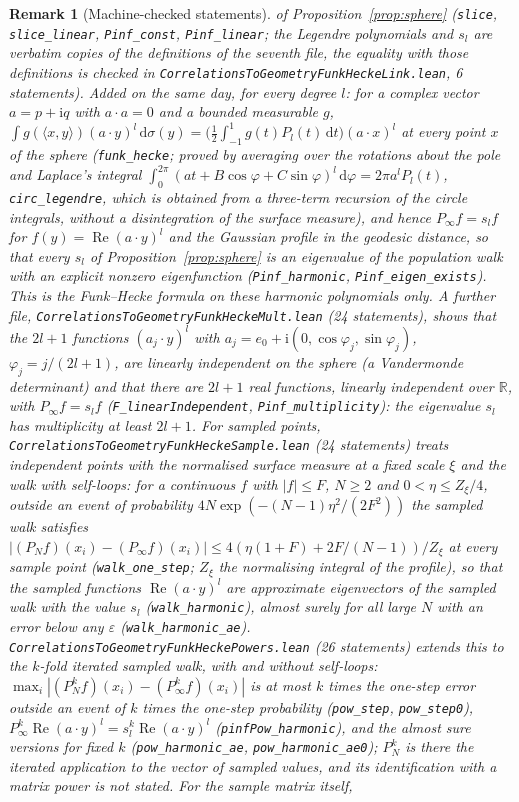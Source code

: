 \documentclass[11pt,a4paper]{article}
\theoremstyle{stmt}
\theoremstyle{defn}
\theoremstyle{rmk}
\newtheorem{remark}[theorem]{Remark}
\numberwithin{equation}{section}
\newcommand{\R}{\mathbb{R}}
\newcommand{\dd}{\mathrm{d}}
\begin{document}
{\begin{remark}[Machine-checked statements]
of Proposition~\ref{prop:sphere} (\texttt{slice}, \texttt{slice\_linear}, \texttt{Pinf\_const}, \texttt{Pinf\_linear}; the Legendre polynomials and $s_l$ are verbatim copies of the definitions of the seventh file, the equality with those definitions is checked in \texttt{CorrelationsToGeometryFunkHeckeLink.lean}, 6 statements). Added on the same day, for every degree $l$: for a complex vector $a=p+\mathrm i q$ with $a\cdot a=0$ and a bounded measurable $g$, $\int g(\langle x,y\rangle)(a\cdot y)^l\,\dd\sigma(y)=\bigl(\tfrac12\int_{-1}^1 g(t)P_l(t)\,\dd t\bigr)(a\cdot x)^l$ at every point $x$ of the sphere (\texttt{funk\_hecke}; proved by averaging over the rotations about the pole and Laplace's integral $\int_0^{2\pi}(at+B\cos\varphi+C\sin\varphi)^l\,\dd\varphi=2\pi a^lP_l(t)$, \texttt{circ\_legendre}, which is obtained from a three-term recursion of the circle integrals, without a disintegration of the surface measure), and hence $P_\infty f=s_l f$ for $f(y)=\operatorname{Re}(a\cdot y)^l$ and the Gaussian profile in the geodesic distance, so that every $s_l$ of Proposition~\ref{prop:sphere} is an eigenvalue of the population walk with an explicit nonzero eigenfunction (\texttt{Pinf\_harmonic}, \texttt{Pinf\_eigen\_exists}). This is the Funk--Hecke formula on these harmonic polynomials only. A further file, \texttt{CorrelationsToGeometryFunkHeckeMult.lean} (24 statements), shows that the $2l+1$ functions $(a_j\cdot y)^l$ with $a_j=e_0+\mathrm i(0,\cos\varphi_j,\sin\varphi_j)$, $\varphi_j=j/(2l+1)$, are linearly independent on the sphere (a Vandermonde determinant) and that there are $2l+1$ real functions, linearly independent over $\R$, with $P_\infty f=s_lf$ (\texttt{F\_linearIndependent}, \texttt{Pinf\_multiplicity}): the eigenvalue $s_l$ has multiplicity at least $2l+1$. For sampled points, \texttt{CorrelationsToGeometryFunkHeckeSample.lean} (24 statements) treats independent points with the normalised surface measure at a fixed scale $\xi$ and the walk with self-loops: for a continuous $f$ with $|f|\le F$, $N\ge2$ and $0<\eta\le Z_\xi/4$, outside an event of probability $4N\exp(-(N-1)\eta^2/(2F^2))$ the sampled walk satisfies $|(P_Nf)(x_i)-(P_\infty f)(x_i)|\le4(\eta(1+F)+2F/(N-1))/Z_\xi$ at every sample point (\texttt{walk\_one\_step}; $Z_\xi$ the normalising integral of the profile), so that the sampled functions $\operatorname{Re}(a\cdot y)^l$ are approximate eigenvectors of the sampled walk with the value $s_l$ (\texttt{walk\_harmonic}), almost surely for all large $N$ with an error below any $\varepsilon$ (\texttt{walk\_harmonic\_ae}). \texttt{CorrelationsToGeometryFunkHeckePowers.lean} (26 statements) extends this to the $k$-fold iterated sampled walk, with and without self-loops: $\max_i|(P_N^kf)(x_i)-(P_\infty^kf)(x_i)|$ is at most $k$ times the one-step error outside an event of $k$ times the one-step probability (\texttt{pow\_step}, \texttt{pow\_step0}), $P_\infty^k\operatorname{Re}(a\cdot y)^l=s_l^k\operatorname{Re}(a\cdot y)^l$ (\texttt{pinfPow\_harmonic}), and the almost sure versions for fixed $k$ (\texttt{pow\_harmonic\_ae}, \texttt{pow\_harmonic\_ae0}); $P_N^k$ is there the iterated application to the vector of sampled values, and its identification with a matrix power is not stated. For the sample matrix itself, 
\end{remark}}
\end{document}
